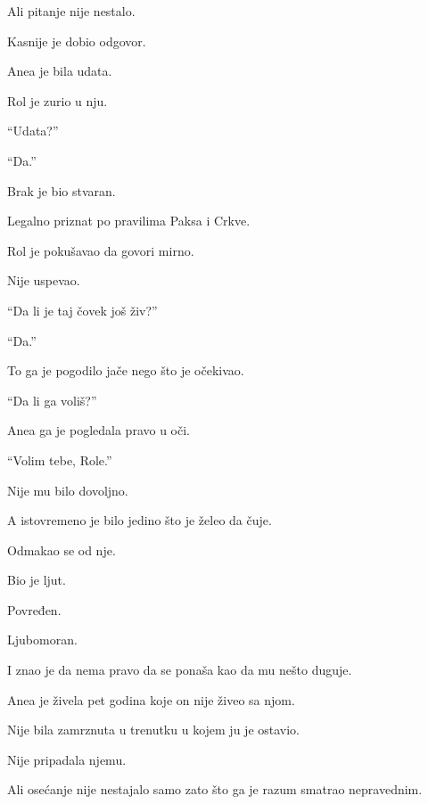 Ali pitanje nije nestalo.

\bigskip

Kasnije je dobio odgovor.

\bigskip

Anea je bila udata.

\bigskip

Rol je zurio u nju.

``Udata?''

``Da.''

\bigskip

Brak je bio stvaran.

Legalno priznat po pravilima Paksa i Crkve.

\bigskip

Rol je pokušavao da govori mirno.

Nije uspevao.

``Da li je taj čovek još živ?''

``Da.''

\bigskip

To ga je pogodilo jače nego što je očekivao.

\bigskip

``Da li ga voliš?''

\bigskip

Anea ga je pogledala pravo u oči.

``Volim tebe, Role.''

\bigskip

Nije mu bilo dovoljno.

A istovremeno je bilo jedino što je želeo da čuje.

\bigskip

Odmakao se od nje.

\bigskip

Bio je ljut.

Povređen.

Ljubomoran.

\bigskip

I znao je da nema pravo da se ponaša kao da mu nešto duguje.

\bigskip

Anea je živela pet godina koje on nije živeo sa njom.

Nije bila zamrznuta u trenutku u kojem ju je ostavio.

Nije pripadala njemu.

\bigskip

Ali osećanje nije nestajalo samo zato što ga je razum smatrao nepravednim.

\bigskip

